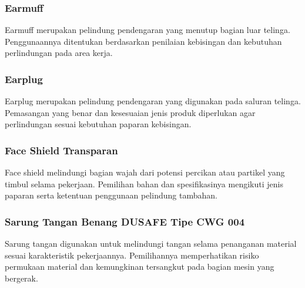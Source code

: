 
\Needspace{6.8cm}
\subsubsection{Earmuff}

Earmuff merupakan pelindung pendengaran yang menutup bagian luar telinga. Penggunaannya ditentukan berdasarkan penilaian kebisingan dan kebutuhan perlindungan pada area kerja.


\Needspace{6.8cm}
\subsubsection{Earplug}

Earplug merupakan pelindung pendengaran yang digunakan pada saluran telinga. Pemasangan yang benar dan kesesuaian jenis produk diperlukan agar perlindungan sesuai kebutuhan paparan kebisingan.


\Needspace{6.8cm}
\subsubsection{Face Shield Transparan}

Face shield melindungi bagian wajah dari potensi percikan atau partikel yang timbul selama pekerjaan. Pemilihan bahan dan spesifikasinya mengikuti jenis paparan serta ketentuan penggunaan pelindung tambahan.


\Needspace{6.8cm}
\subsubsection{Sarung Tangan Benang DUSAFE Tipe CWG 004}

Sarung tangan digunakan untuk melindungi tangan selama penanganan material sesuai karakteristik pekerjaannya. Pemilihannya memperhatikan risiko permukaan material dan kemungkinan tersangkut pada bagian mesin yang bergerak.

